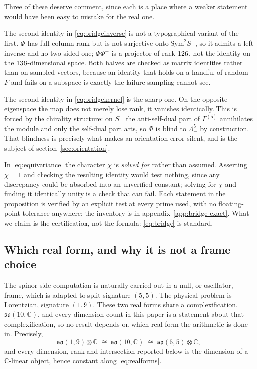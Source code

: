 \documentclass[11pt,a4paper]{article}
\theoremstyle{definition}
\theoremstyle{remark}
\begin{document}
Three of these deserve comment, since each is a place where a weaker statement
would have been easy to mistake for the real one.

The second identity in \eqref{eq:bridgeinverse} is not a typographical variant of
the first. $\Phi$ has full column rank but is not surjective onto
$\mathrm{Sym}^2 S_+$, so it admits a left inverse and no two-sided one;
$\Phi\Phi^-$ is a projector of rank $126$, not the identity on the
$136$-dimensional space. Both halves are checked as matrix identities
rather than on sampled vectors, because an identity that holds on a handful of
random $F$ and fails on a subspace is exactly the failure sampling cannot see.

The second identity in \eqref{eq:bridgekernel} is the sharp one. On the opposite
eigenspace the map does not merely lose rank, it vanishes identically. This is
forced by the chirality structure: on $S_+$ the anti-self-dual part of
$\Gamma^{(5)}$ annihilates the module and only the self-dual part acts, so
$\Phi$ is blind to $\Lambda^5_-$ by construction. That blindness is precisely
what makes an orientation error silent, and is the subject of
section~\ref{sec:orientation}.

In \eqref{eq:equivariance} the character $\chi$ is \emph{solved for} rather than
assumed. Asserting $\chi = 1$ and checking the resulting identity would test
nothing, since any discrepancy could be absorbed into an unverified constant;
solving for $\chi$ and finding it identically unity is a check that can fail.
Each statement in the proposition is verified by an explicit test at every prime
used, with no floating-point tolerance anywhere; the inventory is in
appendix~\ref{app:bridge-exact}. What we claim is the certification, not the
formula: \eqref{eq:bridge} is standard.

\subsection{Which real form, and why it is not a frame choice}

The spinor-side computation is naturally carried out in a null, or oscillator,
frame, which is adapted to split signature $(5,5)$. The physical problem is
Lorentzian, signature $(1,9)$. These two real forms share a complexification,
$\mathfrak{so}(10,\mathbb{C})$, and every dimension count in this paper is a
statement about that complexification, so no result depends on which real form
the arithmetic is done in. Precisely,
\begin{equation}
\mathfrak{so}(1,9)\otimes\mathbb{C}
 \;\cong\; \mathfrak{so}(10,\mathbb{C})
 \;\cong\; \mathfrak{so}(5,5)\otimes\mathbb{C},
\label{eq:realforms}
\end{equation}
and every dimension, rank and intersection reported below is the dimension of a
$\mathbb{C}$-linear object, hence constant along \eqref{eq:realforms}.
\end{document}
